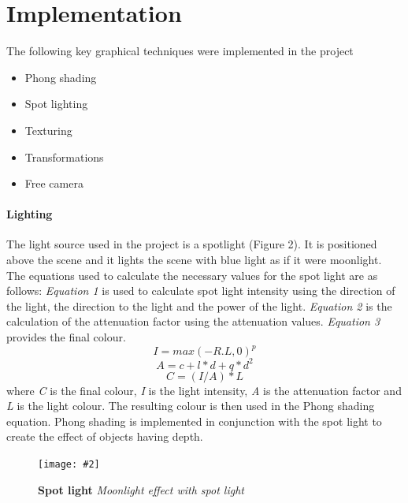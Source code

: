 \documentclass[10pt, a4paper]{article}
\newcommand{\figuremacro}[5]{
    \begin{figure}[#1]
        \centering
        \texttt{[image: \#2]}
        \caption[#3]{\textbf{#3}#4}
        \label{fig:#2}
    \end{figure}
}
\begin{document}
    \section{Implementation}
    The following key graphical techniques were implemented in the project
    \begin{itemize}
        \item Phong shading
        \item Spot lighting
        \item Texturing
        \item Transformations
        \item Free camera
    \end{itemize}

    \paragraph{Lighting}
    The light source used in the project is a spotlight (Figure 2). It is positioned above the scene and it lights the scene with blue light as if it were moonlight. The equations used to calculate the necessary values for the spot light are as follows:
    \textit{Equation 1} is used to calculate spot light intensity using the direction of the light, the direction to the light and the power of the light.
    \textit{Equation 2} is the calculation of the attenuation factor using the attenuation values.
    \textit{Equation 3} provides the final colour.
    \begin{equation}
    I =  max(-R . L, 0)^p
    \end{equation}
    \begin{equation}
    A =  c + l * d + q*d^2
    \end{equation}
    \begin{equation}
    C = (I / A) * L
    \end{equation}
    where \textit{C} is the final colour, \textit{I} is the light intensity, \textit{A} is the attenuation factor and \textit{L} is the light colour. The resulting colour is then used in the Phong shading equation. Phong shading is implemented in conjunction with the spot light to create the effect of objects having depth.
    \figuremacro{h}{light.png}{Spot light}{ \textit{Moonlight effect with spot light} }{1.0}
\end{document}
